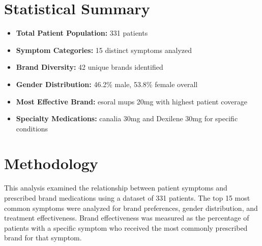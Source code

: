 \documentclass[10pt]{article}
\begin{document}
\section{Statistical Summary}

\begin{itemize}
\item \textbf{Total Patient Population:} 331 patients
\item \textbf{Symptom Categories:} 15 distinct symptoms analyzed
\item \textbf{Brand Diversity:} 42 unique brands identified
\item \textbf{Gender Distribution:} 46.2\% male, 53.8\% female overall
\item \textbf{Most Effective Brand:} esoral mups 20mg with highest patient coverage
\item \textbf{Specialty Medications:} canalia 30mg and Dexilene 30mg for specific conditions
\end{itemize}

\section{Methodology}

This analysis examined the relationship between patient symptoms and prescribed brand medications using a dataset of 331 patients. The top 15 most common symptoms were analyzed for brand preferences, gender distribution, and treatment effectiveness. Brand effectiveness was measured as the percentage of patients with a specific symptom who received the most commonly prescribed brand for that symptom.
\end{document}
